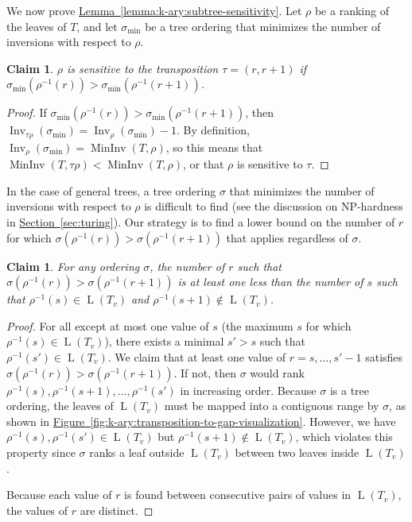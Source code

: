 \documentclass[11pt]{article}
\numberwithin{equation}{section}
\newtheorem{claim}[theorem]{Claim}
\theoremstyle{definition}
\theoremstyle{plain}
\newcommand{\expref}[2]{\hyperref[#2]{#1~\ref{#2}}}
\DeclareMathOperator{\leafset}{L}
\newcommand{\ranking}{\rho}
\newcommand{\ordering}{\sigma}
\newcommand{\transposition}{\tau}
\DeclareMathOperator{\Inv}{Inv}
\DeclareMathOperator{\MInv}{MinInv}
\begin{document}
We now prove \expref{Lemma}{lemma:k-ary:subtree-sensitivity}. Let $\ranking$ be a ranking of the leaves of $T$, and let $\ordering_{\min}$ be a tree ordering that minimizes the number of inversions with respect to $\ranking$.

\begin{claim}
    \label{claim:k-ary:decreasing-transposition}
    $\ranking$ is sensitive to the transposition $\transposition=(r,r+1)$ if $\ordering_{\min}(\ranking^{-1}(r))>\ordering_{\min}(\ranking^{-1}(r+1))$.
\end{claim}

\begin{proof}
    If $\ordering_{\min}(\ranking^{-1}(r))>\ordering_{\min}(\ranking^{-1}(r+1))$, then $\Inv_{\transposition \ranking}(\ordering_{\min})=\Inv_{\ranking}(\ordering_{\min})-1$. By definition, $\Inv_{\ranking}(\ordering_{\min})=\MInv(T,\ranking)$, so this means that $\MInv(T,\transposition \ranking)< \MInv(T,\ranking)$, or that $\ranking$ is sensitive to $\transposition$.
\end{proof}

In the case of general trees, a tree ordering $\ordering$ that minimizes the number of inversions with respect to $\ranking$ is difficult to find (see the discussion on NP-hardness in \expref{Section}{sec:turing}). Our strategy is to find a lower bound on the number of $r$ for which $\ordering(\ranking^{-1}(r))>\ordering(\ranking^{-1}(r+1))$ that applies regardless of $\ordering$.

\begin{claim}
    \label{claim:k-ary:transposition-to-gap}
    For any ordering $\ordering$, the number of $r$ such that $\ordering(\ranking^{-1}(r))>\ordering(\ranking^{-1}(r+1))$ is at least one less than the number of $s$ such that $\ranking^{-1}(s)\in \leafset(T_v)$ and $\ranking^{-1}(s+1)\not\in \leafset(T_v)$.
\end{claim}

\begin{proof}
    For all except at most one value of $s$ (the maximum $s$ for which $\ranking^{-1}(s)\in \leafset(T_v)$), there exists a minimal $s'>s$ such that $\ranking^{-1}(s')\in \leafset(T_v)$. We claim that at least one value of $r=s,\dots,s'-1$ satisfies $\ordering(\ranking^{-1}(r))>\ordering(\ranking^{-1}(r+1))$. If not, then $\ordering$ would rank $\ranking^{-1}(s),\ranking^{-1}(s+1),\dots,\ranking^{-1}(s')$ in increasing order. Because $\ordering$ is a tree ordering, the leaves of $\leafset(T_v)$ must be mapped into a contiguous range by $\ordering$, as shown in \expref{Figure}{fig:k-ary:transposition-to-gap-visualization}. However, we have $\ranking^{-1}(s),\ranking^{-1}(s')\in \leafset(T_v)$ but $\ranking^{-1}(s+1)\not\in \leafset(T_v)$, which violates this property since $\ordering$ ranks a leaf outside $\leafset(T_v)$ between two leaves inside $\leafset(T_v)$.
    
    Because each value of $r$ is found between consecutive pairs of values in $\leafset(T_v)$, the values of $r$ are distinct.
\end{proof}
\end{document}
